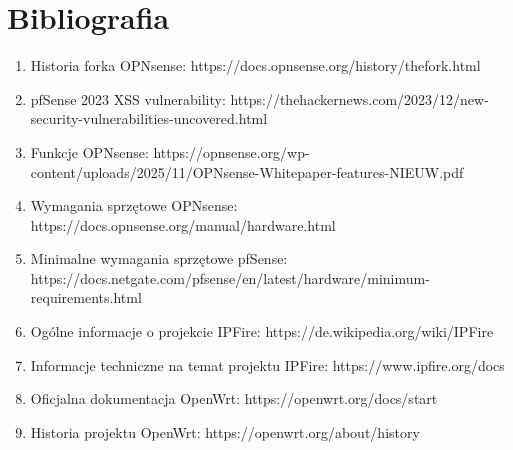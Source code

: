 \documentclass[12pt,a4paper]{article}
\begin{document}
\section{Bibliografia}
\begin{enumerate}
	\item Historia forka OPNsense: https://docs.opnsense.org/history/thefork.html
	\item pfSense 2023 XSS vulnerability: https://thehackernews.com/2023/12/new-security-vulnerabilities-uncovered.html
	\item Funkcje OPNsense: https://opnsense.org/wp-content/uploads/2025/11/OPNsense-Whitepaper-features-NIEUW.pdf
	\item Wymagania sprzętowe OPNsense: https://docs.opnsense.org/manual/hardware.html
	\item Minimalne wymagania sprzętowe pfSense: https://docs.netgate.com/pfsense/en/latest/hardware/minimum-requirements.html
	\item Ogólne informacje o projekcie IPFire: https://de.wikipedia.org/wiki/IPFire
	\item Informacje techniczne na temat projektu IPFire: https://www.ipfire.org/docs
	\item Oficjalna dokumentacja OpenWrt: https://openwrt.org/docs/start
	\item Historia projektu OpenWrt: https://openwrt.org/about/history
\end{enumerate}
\end{document}
